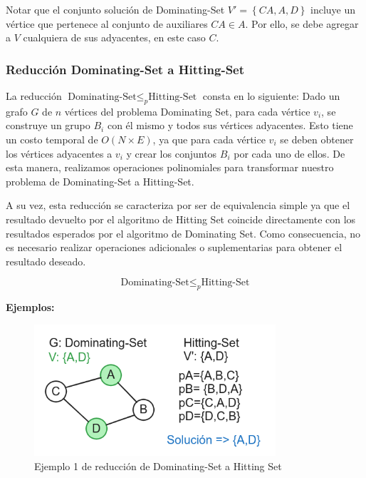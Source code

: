 Notar que el conjunto solución de Dominating-Set $V'=\left\{CA,A,D\right\}$ incluye un vértice que pertenece al conjunto de auxiliares $CA \in A$. Por ello, se debe agregar a $V$ cualquiera de sus adyacentes, en este caso $C$.

\subsubsection{Reducción Dominating-Set a Hitting-Set}

La reducción $\text{Dominating-Set} \leq_{p} \text{Hitting-Set}$ consta en lo siguiente:
Dado un grafo $G$ de $n$ vértices del problema Dominating Set, para cada vértice $v_{i}$, se construye un grupo $B_{i}$ con él mismo y todos sus vértices adyacentes. Esto tiene un costo temporal de $O(N \times E)$, ya que para cada vértice $v_{i}$ se deben obtener los vértices adyacentes a $v_{i}$ y crear los conjuntos $B_{i}$ por cada uno de ellos. De esta manera, realizamos operaciones polinomiales para transformar nuestro problema de Dominating-Set a Hitting-Set. 

A su vez, esta reducción se caracteriza por ser de equivalencia simple ya que el resultado devuelto por el algoritmo de Hitting Set coincide directamente con los resultados esperados por el algoritmo de Dominating Set. Como consecuencia, no es necesario realizar operaciones adicionales o suplementarias para obtener el resultado deseado.

\[\text{Dominating-Set}  \leq _{p} \text{Hitting-Set}\]

\textbf{Ejemplos:} 

\begin{figure}[H]
    \centering
    \includegraphics[width=0.8\textwidth]{img/ejemplo1_DS-HS.png}
    \caption{Ejemplo 1 de reducción de Dominating-Set a Hitting Set}
    \label{fig:ejemplo1_DS-HS}
\end{figure}



